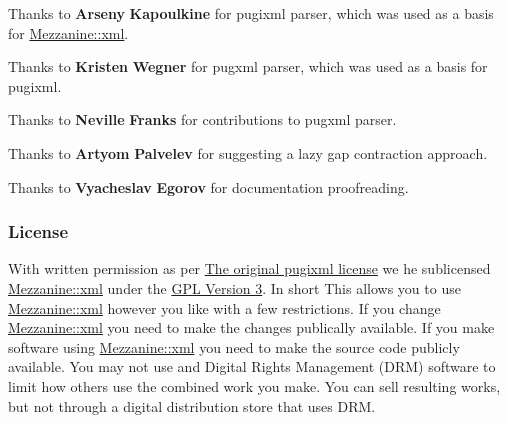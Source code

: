  \par
 Thanks to {\bfseries Arseny} {\bfseries Kapoulkine} for pugixml parser, which was used as a basis for \hyperlink{namespaceMezzanine_1_1xml}{Mezzanine::xml}. \par
 \par
 Thanks to {\bfseries Kristen} {\bfseries Wegner} for pugxml parser, which was used as a basis for pugixml. \par
 \par
 Thanks to {\bfseries Neville} {\bfseries Franks} for contributions to pugxml parser. \par
 \par
 Thanks to {\bfseries Artyom} {\bfseries Palvelev} for suggesting a lazy gap contraction approach. \par
 \par
 Thanks to {\bfseries Vyacheslav} {\bfseries Egorov} for documentation proofreading. \par
 \par
 \hypertarget{XMLManual_XMLLicense}{}\subsubsection{License}\label{XMLManual_XMLLicense}
With written permission as per \hyperlink{OriginalpugixmlLicense}{The original pugixml license} we he sublicensed \hyperlink{namespaceMezzanine_1_1xml}{Mezzanine::xml} under the \hyperlink{GPLLicense}{GPL Version 3}. In short This allows you to use \hyperlink{namespaceMezzanine_1_1xml}{Mezzanine::xml} however you like with a few restrictions. If you change \hyperlink{namespaceMezzanine_1_1xml}{Mezzanine::xml} you need to make the changes publically available. If you make software using \hyperlink{namespaceMezzanine_1_1xml}{Mezzanine::xml} you need to make the source code publicly available. You may not use and Digital Rights Management (DRM) software to limit how others use the combined work you make. You can sell resulting works, but not through a digital distribution store that uses DRM.

